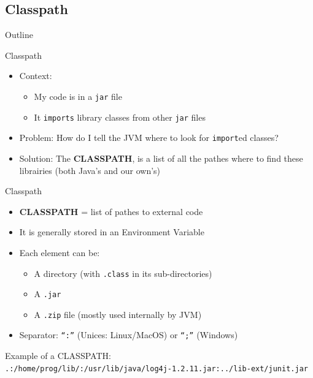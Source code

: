 \documentclass[English,c,%
hyperref={%
    pdftitle={FISA-DE2 OOP in Java},%
    pdfauthor={Muller, Gravier, Laforest, Subercaze},%
    pdfsubject={OOP in Java},%
    pdfkeywords={OOP, Java},%
    colorlinks=true,%
    urlcolor=blue,%
    linkcolor=%
    },%
xcolor={pdftex,svgnames} %
]{beamer}
\begin{document}
\subsection{Classpath}
   \begin{frame}{Outline}
       \tableofcontents[currentsubsection]
   \end{frame}

\begin{frame}{Classpath}
  \begin{itemize}
    \item Context:
    \begin{itemize}
      \item My code is in a \texttt{jar} file
      \item It \texttt{imports} library classes from other \texttt{jar} files
    \end{itemize}
    \medskip
    \item Problem: How do I tell the JVM where to look for \texttt{import}ed classes?
    \bigskip
    \item Solution: The \textbf{CLASSPATH}, is a list of all the pathes where to find these librairies (both Java's and our own's)
  \end{itemize}
\end{frame}


\begin{frame}{Classpath}
  \begin{itemize}
    \item \textbf{CLASSPATH} = list of pathes to external code
\medskip
    \item It is generally stored in an Environment Variable
    \item Each element can be:
    \begin{itemize}
      \item A directory (with \texttt{.class} in its sub-directories)
      \item A \texttt{.jar}
      \item A \texttt{.zip} file (mostly used internally by JVM)
    \end{itemize}
    \item Separator: \texttt{``:''} (Unices: Linux/MacOS) or \texttt{``;''} (Windows)
\end{itemize}
\bigskip
Example of a CLASSPATH:\\
{\footnotesize \texttt{.:/home/prog/lib/:/usr/lib/java/log4j-1.2.11.jar:../lib-ext/junit.jar}}
\end{frame}
\end{document}
